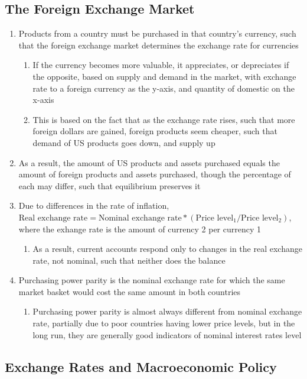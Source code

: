\documentclass[11 pt, twoside]{article}
\begin{document}
\subsection{The Foreign Exchange Market}
\begin{enumerate}
\item Products from a country must be purchased in that country's currency, such that the foreign exchange market determines the exchange rate for currencies
\begin{enumerate}
\item If the currency becomes more valuable, it appreciates, or depreciates if the opposite, based on supply and demand in the market, with exchange rate to a foreign currency as the y-axis, and quantity of domestic on the x-axis
\item This is based on the fact that as the exchange rate rises, such that more foreign dollars are gained, foreign products seem cheaper, such that demand of US products goes down, and supply up
\end{enumerate}
\item As a result, the amount of US products and assets purchased equals the amount of foreign products and assets purchased, though the percentage of each may differ, such that equilibrium preserves it
\item Due to differences in the rate of inflation, $\text{Real exchange rate} = \text{Nominal exchange rate} * (\text{Price level}_1/\text{Price level}_2)$, where the exhange rate is the amount of currency 2 per currency 1
\begin{enumerate}
\item As a result, current accounts respond only to changes in the real exchange rate, not nominal, such that neither does the balance
\end{enumerate}
\item Purchasing power parity is the nominal exchange rate for which the same market basket would cost the same amount in both countries
\begin{enumerate}
\item Purchasing power parity is almost always different from nominal exchange rate, partially due to poor countries having lower price levels, but in the long run, they are generally good indicators of nominal interest rates level
\end{enumerate}
\end{enumerate}

\subsection{Exchange Rates and Macroeconomic Policy}
\end{document}

